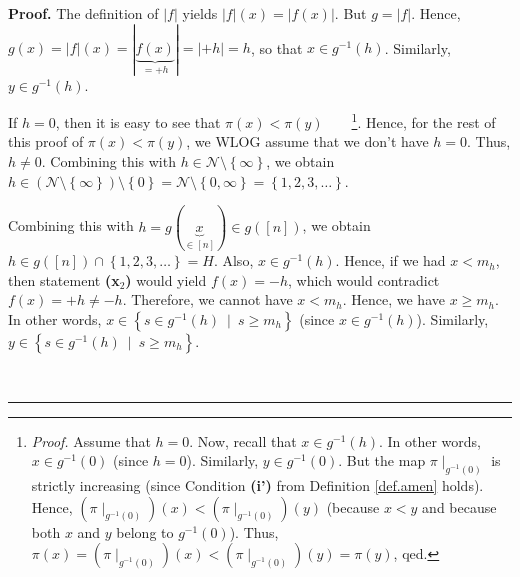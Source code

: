 \documentclass[numbers=enddot,12pt,final,onecolumn,notitlepage]{scrartcl}%
\theoremstyle{definition}
\newenvironment{proof}[1][Proof]{\noindent\textbf{#1.} }{\ \rule{0.5em}{0.5em}}
\newenvironment{verlong}{}{}
\begin{document}
\begin{verlong}
\begin{proof}
The definition of $\left\vert f\right\vert $ yields $\left\vert f\right\vert
\left(  x\right)  =\left\vert f\left(  x\right)  \right\vert $. But
$g=\left\vert f\right\vert $. Hence, $g\left(  x\right)  =\left\vert
f\right\vert \left(  x\right)  =\left\vert \underbrace{f\left(  x\right)
}_{=+h}\right\vert =\left\vert +h\right\vert =h$, so that $x\in g^{-1}\left(
h\right)  $. Similarly, $y\in g^{-1}\left(  h\right)  $.

If $h=0$, then it is easy to see that $\pi\left(  x\right)  <\pi\left(
y\right)  $\ \ \ \ \footnote{\textit{Proof.} Assume that $h=0$. Now, recall
that $x\in g^{-1}\left(  h\right)  $. In other words, $x\in g^{-1}\left(
0\right)  $ (since $h=0$). Similarly, $y\in g^{-1}\left(  0\right)  $. But the
map $\pi\mid_{g^{-1}\left(  0\right)  }$ is strictly increasing (since
Condition \textbf{(i')} from Definition \ref{def.amen} holds). Hence, $\left(
\pi\mid_{g^{-1}\left(  0\right)  }\right)  \left(  x\right)  <\left(  \pi
\mid_{g^{-1}\left(  0\right)  }\right)  \left(  y\right)  $ (because $x<y$ and
because both $x$ and $y$ belong to $g^{-1}\left(  0\right)  $). Thus,
$\pi\left(  x\right)  =\left(  \pi\mid_{g^{-1}\left(  0\right)  }\right)
\left(  x\right)  <\left(  \pi\mid_{g^{-1}\left(  0\right)  }\right)  \left(
y\right)  =\pi\left(  y\right)  $, qed.}. Hence, for the rest of this proof of
$\pi\left(  x\right)  <\pi\left(  y\right)  $, we WLOG assume that we don't
have $h=0$. Thus, $h\neq0$. Combining this with $h\in\mathcal{N}%
\setminus\left\{  \infty\right\}  $, we obtain $h\in\left(  \mathcal{N}%
\setminus\left\{  \infty\right\}  \right)  \setminus\left\{  0\right\}
=\mathcal{N}\setminus\left\{  0,\infty\right\}  =\left\{  1,2,3,\ldots
\right\}  $.

Combining this with $h=g\left(  \underbrace{x}_{\in\left[  n\right]  }\right)
\in g\left(  \left[  n\right]  \right)  $, we obtain $h\in g\left(  \left[
n\right]  \right)  \cap\left\{  1,2,3,\ldots\right\}  =H$. Also, $x\in
g^{-1}\left(  h\right)  $. Hence, if we had $x<m_{h}$, then statement
\textbf{(x}$_{2}$\textbf{)} would yield $f\left(  x\right)  =-h$, which would
contradict $f\left(  x\right)  =+h\neq-h$. Therefore, we cannot have $x<m_{h}%
$. Hence, we have $x\geq m_{h}$. In other words, $x\in\left\{  s\in
g^{-1}\left(  h\right)  \ \mid\ s\geq m_{h}\right\}  $ (since $x\in
g^{-1}\left(  h\right)  $). Similarly, $y\in\left\{  s\in g^{-1}\left(
h\right)  \ \mid\ s\geq m_{h}\right\}  $.


\end{proof}
\end{verlong}
\end{document}

